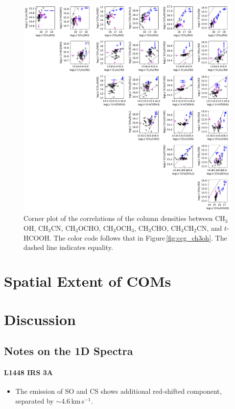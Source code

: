 \documentclass[twocolumn]{aastex62}
\newcommand{\kms}{\mbox{\,km\,s$^{-1}$}}
\newcommand{\methylformate}{\mbox{CH$_{3}$OCHO}}
\newcommand{\methanol}{\mbox{CH$_{3}$OH}}
\newcommand{\dimethylether}{\mbox{CH$_{3}$OCH$_{3}$}}
\newcommand{\acetaldehyde}{\mbox{CH$_{3}$CHO}}
\newcommand{\ethylcyanide}{\mbox{CH$_{3}$CH$_{2}$CN}}
\newcommand{\methylcyanide}{\mbox{CH$_{3}$CN}}
\begin{document}
\begin{figure}[htbp!]
  \centering
  \includegraphics[width=\textwidth]{corner_Ncol.pdf}
  \caption{Corner plot of the correlations of the column densities between \methanol, \methylcyanide, \methylformate, \dimethylether, \acetaldehyde, \ethylcyanide, and $t$-HCOOH.  The color code follows that in Figure\,\ref{fig:ccg_ch3oh}.  The dashed line indicates equality.}
  \label{fig:corner}
\end{figure}

\section{Spatial Extent of COMs}
\section{Discussion}
\subsection{Notes on the 1D Spectra}
\paragraph{L1448 IRS 3A}
\begin{itemize}
  \item The emission of SO and CS shows additional red-shifted component, separated by $\sim$4.6\kms.
\end{itemize}
\end{document}
